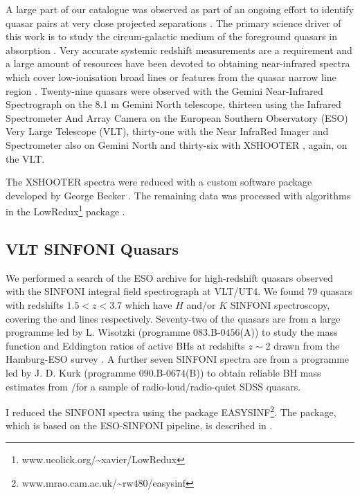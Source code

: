 A large part of our catalogue was observed as part of an ongoing effort to identify quasar pairs at very close projected separations \citep[Quasars Probing Quasars\footnote{www.ucolick.org/\textasciitilde xavier/QPQ/Quasars\_Probing\_Quasars} (QPQ);][]{hennawi06a,hennawi10}. 
The primary science driver of this work is to study the circum-galactic medium of the foreground quasars in absorption \citep{hennawi06b}.
Very accurate systemic redshift measurements are a requirement and a large amount of resources have been devoted to obtaining near-infrared spectra which cover low-ionisation broad lines or features from the quasar narrow line region \citep{prochaska09,lau16,hennawi15}. 
Twenty-nine quasars were observed with the Gemini Near-Infrared Spectrograph \citep[GNIRS;][]{elias06} on the 8.1 m Gemini North telescope, thirteen using the Infrared Spectrometer And Array Camera \citep[ISAAC;][]{moorwood98b} on the European Southern Observatory (ESO) Very Large Telescope (VLT), thirty-one with the Near InfraRed Imager and Spectrometer \citep[NIRI;][]{hodapp03} also on Gemini North and thirty-six with XSHOOTER \citep{vernet11}, again, on the VLT. 

The  XSHOOTER  spectra  were  reduced  with  a  custom  software  package  developed  by  George  Becker \citep[for details, see][]{lau16}. 
The remaining data was processed with algorithms in the LowRedux\footnote{www.ucolick.org/\textasciitilde xavier/LowRedux} package \citep[see][]{prochaska09}.

\subsection{VLT SINFONI Quasars}

We performed a search of the ESO archive for high-redshift quasars observed with the SINFONI  integral  field  spectrograph \citep{eisenhauer03,bonnet04} at VLT/UT4.
We found $79$ quasars with redshifts $1.5 < z < 3.7$ which have $H$ and/or $K$ SINFONI spectroscopy, covering the \hb and \ha lines respectively. 
Seventy-two of the quasars are from a large programme led by L. Wisotzki (programme $083$.B-$0456$(A)) to study the mass function and Eddington ratios of active BHs at redshifts $z\sim 2$ drawn from the Hamburg-ESO survey \citep{wisotzki00}.
A further seven SINFONI spectra are from a programme led by  J. D. Kurk (programme $090$.B-$0674$(B)) to obtain reliable BH mass estimates from \hans/\hb for a sample of radio-loud/radio-quiet SDSS quasars.

I reduced the SINFONI spectra using the package EASYSINF\footnote{www.mrao.cam.ac.uk/\textasciitilde rw$480$/easysinf}.  
The package, which is based on the ESO-SINFONI pipeline, is described in \citet{williams16}. 

